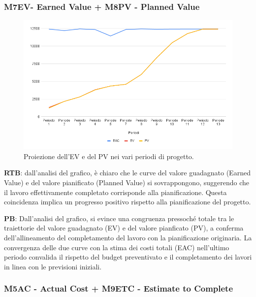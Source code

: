\subsubsection{M7EV- Earned Value + M8PV - Planned Value} 

\vspace{0.3cm}

\begin{figure}[H]
    \centering
    \includegraphics[width=1\textwidth]{../Images/PianoDiQualifica/EV_PV.png}
    \caption{Proiezione dell’EV e del PV nei vari periodi di progetto.}
    \label{fig:3}
\end{figure}

\vspace{0.2cm}

\textbf{RTB}: dall'analisi del grafico, è chiaro che le curve del valore guadagnato (Earned Value) e del valore pianificato (Planned Value) si sovrappongono, suggerendo che il lavoro effettivamente completato corrisponde alla pianificazione. 
Questa coincidenza implica un progresso positivo rispetto alla pianificazione del progetto.

\vspace{0.2cm}
\textbf{PB}:  Dall'analisi del grafico, si evince una congruenza pressoché totale tra le traiettorie del valore guadagnato (EV) e del valore pianficato (PV), a conferma dell'allineamento del completamento del lavoro con la pianificazione originaria.
La convergenza delle due curve con la stima dei costi totali (EAC) nell'ultimo periodo convalida il rispetto del budget preventivato e il completamento dei lavori in linea con le previsioni iniziali.

\subsubsection{M5AC - Actual Cost + M9ETC - Estimate to Complete}

